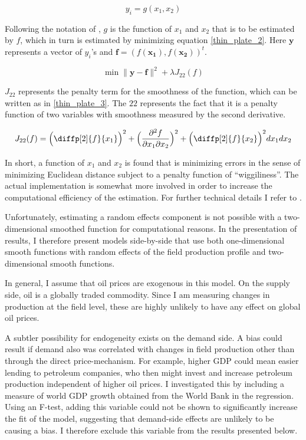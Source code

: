 \documentclass[12pt]{article}
\begin{document}
	\begin{equation}
	y_i = g(x_1, x_2)
	\label{thin_plate_1}
	\end{equation}

Following the notation of \citet{wood_generalized_2006}, $g$ is the function of $x_1$ and $x_2$ that is to be estimated by $f$, which in turn is estimated by minimizing equation \ref{thin_plate_2}.  Here $\boldsymbol{y}$ represents a vector of $y_i$'s and $\boldsymbol{f} = (f(\boldsymbol{x_1}),f(\boldsymbol{x_2}))^t$.   

	\begin{equation}
\min \|\boldsymbol{y-f}\|^2 + \lambda J_{22}(f)
\label{thin_plate_2}
	\end{equation}

$J_{22}$ represents the penalty term for the smoothness of the function, which can be written as in \ref{thin_plate_3}.  The $22$ represents the fact that it is a penalty function of two variables with smoothness measured by the second derivative.

	\begin{equation}
	J_{22}(f)= \Big(  \diffp[2]{f}{x_1} \Big)^2 +
	 \Big(\frac{\partial^2 f}{\partial x_1 \partial x_2}\Big)^2 + 
	\Big(\diffp[2]{f}{x_2} \Big)^2dx_1 dx_2
\label{thin_plate_3}
	\end{equation}

In short, a function of $x_1$ and $x_2$ is found that is minimizing errors in the sense of minimizing Euclidean distance subject to a penalty function of ``wiggiliness''.  The actual implementation is somewhat more involved in order to increase the computational efficiency of the estimation.  For further technical details I refer to \citet{wood_thin_2003}. 

Unfortunately, estimating a random effects component is not possible with a two-dimensional smoothed function for computational reasons.  In the presentation of results, I therefore present models side-by-side that use both one-dimensional smooth functions with random effects of the field production profile and two-dimensional smooth functions.

In general, I assume that oil prices are exogenous in this model. On the supply side, oil is a globally traded commodity.  Since I am measuring changes in production at the field level, these are highly unlikely to have any effect on global oil prices.

A subtler possibility for endogeneity exists on the demand side. A bias could result if demand also was correlated with changes in field production other than through the direct price-mechanism. For example, higher GDP could mean easier lending to petroleum companies, who then might invest and increase petroleum production independent of higher oil prices. I investigated this by including a measure of world GDP growth obtained from the World Bank in the regression. Using an F-test, adding this variable could not be shown to significantly increase the fit of the model, suggesting that demand-side effects are unlikely to be causing a bias. I therefore exclude this variable from the results presented below.
\end{document}
